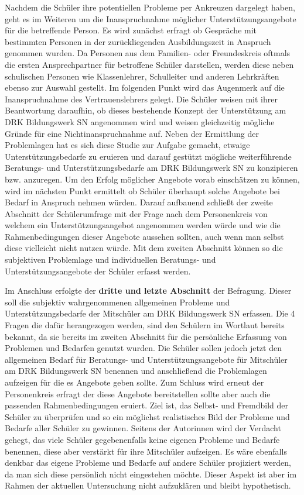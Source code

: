 \noindent
Nachdem die Schüler ihre potentiellen Probleme per Ankreuzen dargelegt haben, geht es im Weiteren um die Inanspruchnahme möglicher Unterstützungsangebote für die betreffende Person. Es wird zunächst erfragt ob Gespräche mit bestimmten Personen in der zurückliegenden Ausbildungszeit in Anspruch genommen wurden. Da Personen aus dem Familien- oder Freundeskreis oftmals die ersten Ansprechpartner für betroffene Schüler darstellen, werden diese neben schulischen Personen wie Klassenlehrer, Schulleiter und anderen Lehrkräften ebenso zur Auswahl gestellt. Im folgenden Punkt wird das Augenmerk auf die Inanspruchnahme des Vertrauenslehrers gelegt. Die Schüler weisen mit ihrer Beantwortung daraufhin, ob dieses bestehende Konzept der Unterstützung am DRK Bildungswerk SN angenommen wird und weisen gleichzeitig mögliche Gründe für eine Nichtinanspruchnahme auf. Neben der Ermittlung der Problemlagen hat es sich diese Studie zur Aufgabe gemacht, etwaige Unterstützungsbedarfe zu eruieren und darauf gestützt mögliche weiterführende Beratungs- und Unterstützungsbedarfe am DRK Bildungswerk SN zu konzipieren bzw. anzuregen. Um den Erfolg möglicher Angebote vorab einschätzen zu können, wird im nächsten Punkt ermittelt ob Schüler überhaupt solche Angebote bei Bedarf in Anspruch nehmen würden. Darauf aufbauend schließt der zweite Abschnitt der Schülerumfrage mit der Frage nach dem Personenkreis von welchem ein Unterstützungsangebot angenommen werden würde und wie die Rahmenbedingungen dieser Angebote aussehen sollten, auch wenn man selbst diese vielleicht nicht nutzen würde. Mit dem zweiten Abschnitt können so die subjektiven Problemlage und individuellen Beratungs- und Unterstützungsangebote der Schüler erfasst werden. 

Im Anschluss erfolgte der \textbf{dritte und letzte Abschnitt} der Befragung. Dieser soll die subjektiv wahrgenommenen allgemeinen Probleme und Unterstützungsbedarfe der Mitschüler am DRK Bildungswerk SN erfassen. Die 4 Fragen die dafür herangezogen werden, sind den Schülern im Wortlaut bereits bekannt, da sie bereits im zweiten Abschnitt für die persönliche Erfassung von Problemen und Bedarfen genutzt wurden. Die Schüler sollen jedoch jetzt den allgemeinen Bedarf für Beratungs- und Unterstützungsangebote für Mitschüler am DRK Bildungswerk SN benennen und anschließend die Problemlagen aufzeigen für die es Angebote geben sollte. Zum Schluss wird erneut der Personenkreis erfragt der diese Angebote bereitstellen sollte aber auch die passenden Rahmenbedingungen eruiert. Ziel ist, das Selbst- und Fremdbild der Schüler zu überprüfen und so ein möglichst realistisches Bild der Probleme und Bedarfe aller Schüler zu gewinnen. Seitens der Autorinnen wird der Verdacht gehegt, das viele Schüler gegebenenfalls keine eigenen Probleme und Bedarfe benennen, diese aber verstärkt für ihre Mitschüler aufzeigen. Es wäre ebenfalls denkbar das eigene Probleme und Bedarfe auf andere Schüler projiziert werden, da man sich diese persönlich nicht eingestehen möchte. Dieser Aspekt ist aber im Rahmen der aktuellen Untersuchung nicht aufzuklären und bleibt hypothetisch. 


